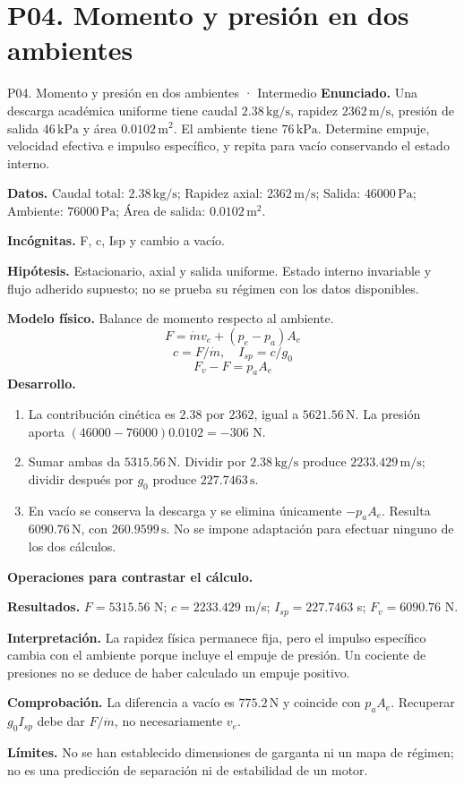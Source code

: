 \section{P04. Momento y presión en dos ambientes}
\begin{studiumworked}{P04. Momento y presión en dos ambientes · Intermedio}
\textbf{Enunciado.} Una descarga académica uniforme tiene caudal $2.38\,\mathrm{kg/s}$, rapidez $2362\,\mathrm{m/s}$, presión de salida $46\,\mathrm{kPa}$ y área $0.0102\,\mathrm{m^2}$. El ambiente tiene $76\,\mathrm{kPa}$. Determine empuje, velocidad efectiva e impulso específico, y repita para vacío conservando el estado interno.

\textbf{Datos.} Caudal total: $2.38\,\mathrm{kg/s}$; Rapidez axial: $2362\,\mathrm{m/s}$; Salida: $46000\,\mathrm{Pa}$; Ambiente: $76000\,\mathrm{Pa}$; Área de salida: $0.0102\,\mathrm{m^2}$.

\textbf{Incógnitas.} F, c, Isp y cambio a vacío.

\textbf{Hipótesis.} Estacionario, axial y salida uniforme. Estado interno invariable y flujo adherido supuesto; no se prueba su régimen con los datos disponibles.

\textbf{Modelo físico.} Balance de momento respecto al ambiente.
\[F=\dot m v_e+(p_e-p_a)A_e\]
\[c=F/\dot m,\quad I_{sp}=c/g_0\]
\[F_v-F=p_aA_e\]
\textbf{Desarrollo.}
\begin{enumerate}
\item La contribución cinética es $2.38$ por $2362$, igual a $5621.56\,\mathrm{N}$. La presión aporta $(46000-76000)0.0102=-306$ N.
\item Sumar ambas da $5315.56\,\mathrm{N}$. Dividir por $2.38\,\mathrm{kg/s}$ produce $2233.429\,\mathrm{m/s}$; dividir después por $g_0$ produce $227.7463\,\mathrm{s}$.
\item En vacío se conserva la descarga y se elimina únicamente $-p_aA_e$. Resulta $6090.76\,\mathrm{N}$, con $260.9599\,\mathrm{s}$. No se impone adaptación para efectuar ninguno de los dos cálculos.
\end{enumerate}
\textbf{Operaciones para contrastar el cálculo.}

\textbf{Resultados.} $F=5315.56$ N; $c=2233.429$ m/s; $I_{sp}=227.7463$ s; $F_v=6090.76$ N.

\textbf{Interpretación.} La rapidez física permanece fija, pero el impulso específico cambia con el ambiente porque incluye el empuje de presión. Un cociente de presiones no se deduce de haber calculado un empuje positivo.

\textbf{Comprobación.} La diferencia a vacío es $775.2\,\mathrm{N}$ y coincide con $p_aA_e$. Recuperar $g_0I_{sp}$ debe dar $F/\dot m$, no necesariamente $v_e$.

\textbf{Límites.} No se han establecido dimensiones de garganta ni un mapa de régimen; no es una predicción de separación ni de estabilidad de un motor.
\end{studiumworked}
